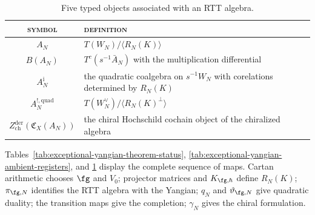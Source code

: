 \begin{table}[ht]
\centering
\small
\caption{Five typed objects associated with an RTT algebra.}
\label{tab:exceptional-yangian-object-firewall}
\begin{tabular}{c|p{9.5cm}}
\textsc{symbol}&\textsc{definition}\\ \hline
$A_N$&$T(W_N)/\langle R_N(K)\rangle$\\
$B(A_N)$&$T^c(s^{-1}\bar A_N)$ with the multiplication differential\\
$A_N^{\mathrm i}$&the quadratic coalgebra on $s^{-1}W_N$ with
corelations determined by $R_N(K)$\\
$A_N^{!,\mathrm{quad}}$&$T(W_N^\vee)/\langle R_N(K)^\perp\rangle$\\
$Z_{\mathrm{ch}}^{\mathrm{der}}(\mathfrak C_X(A_N))$&the chiral
Hochschild cochain object of the chiralized algebra
\end{tabular}
\end{table}

\begin{remark}
\label{rem:exceptional-yangian-three-table-quarantine}
Tables~\ref{tab:exceptional-yangian-theorem-status},
\ref{tab:exceptional-yangian-ambient-registers}, and
\ref{tab:exceptional-yangian-object-firewall} display the complete
sequence of maps.  Cartan arithmetic chooses $\fg$ and $V_0$; projector
matrices and $K_{\fg,\hbar}$ define $R_N(K)$; $\pi_{\fg,N}$ identifies
the RTT algebra with the Yangian; $q_N$ and $\vartheta_{\fg,N}$ give
quadratic duality; the transition maps give the completion; $\gamma_N$
gives the chiral formulation.
\end{remark}
